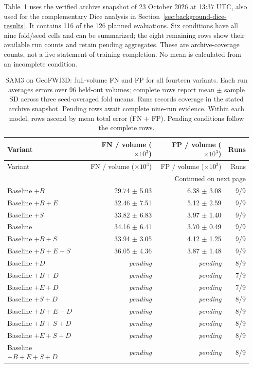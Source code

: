 \documentclass[12pt,a4paper]{article}
\newcommand{\samPending}{\textit{pending}}
\begin{document}
Table~\ref{tab:sam3-geo-errors} uses the verified archive snapshot of
23 October 2026 at 13:37 UTC, also used for the complementary Dice
analysis in Section~\ref{sec:background-dice-results}. It contains
116 of the 126 planned evaluations. Six conditions have all nine
fold/seed cells and can be summarized; the eight remaining rows show
their available run counts and retain pending aggregates. These are
archive-coverage counts, not a live statement of training completion.
No mean is calculated from an incomplete condition.

\begingroup\footnotesize{}
\setlength{\tabcolsep}{4pt}
\renewcommand{\arraystretch}{1.12}
\begin{longtable}{@{}lrrr@{}}
\caption{SAM3 on GeoFWI3D: full-volume FN and FP for all fourteen variants. Each run averages errors over 96 held-out volumes; complete rows report mean $\pm$ sample SD across three seed-averaged fold means. Runs records coverage in the stated archive snapshot. Pending rows await complete nine-run evidence. Within each model, rows ascend by mean total error (FN $+$ FP). Pending conditions follow the complete rows.}
\label{tab:sam3-geo-errors}\\
\hline
Variant & \shortstack{FN / volume\\($\times 10^{3}$)} & \shortstack{FP / volume\\($\times 10^{3}$)} & Runs \\ \hline
\endfirsthead
\hline
Variant & \shortstack{FN / volume\\($\times 10^{3}$)} & \shortstack{FP / volume\\($\times 10^{3}$)} & Runs \\ \hline
\endhead
\hline
\multicolumn{4}{r}{Continued on next page}\\
\endfoot
\hline\endlastfoot
Baseline $+B$ & 29.74 $\pm$ 5.03 & 6.38 $\pm$ 3.08 & 9/9 \\
Baseline $+B+E$ & 32.46 $\pm$ 7.51 & 5.12 $\pm$ 2.59 & 9/9 \\
Baseline $+S$ & 33.82 $\pm$ 6.83 & 3.97 $\pm$ 1.40 & 9/9 \\
Baseline & 34.16 $\pm$ 6.41 & 3.70 $\pm$ 0.49 & 9/9 \\
Baseline $+B+S$ & 33.94 $\pm$ 3.05 & 4.12 $\pm$ 1.25 & 9/9 \\
Baseline $+B+E+S$ & 36.05 $\pm$ 4.36 & 3.87 $\pm$ 1.48 & 9/9 \\
Baseline $+D$ & \samPending & \samPending & 8/9 \\
Baseline $+B+D$ & \samPending & \samPending & 7/9 \\
Baseline $+E+D$ & \samPending & \samPending & 7/9 \\
Baseline $+S+D$ & \samPending & \samPending & 8/9 \\
Baseline $+B+E+D$ & \samPending & \samPending & 8/9 \\
Baseline $+B+S+D$ & \samPending & \samPending & 8/9 \\
Baseline $+E+S+D$ & \samPending & \samPending & 8/9 \\
Baseline $+B+E+S+D$ & \samPending & \samPending & 8/9 \\
\end{longtable}
\endgroup
\end{document}

